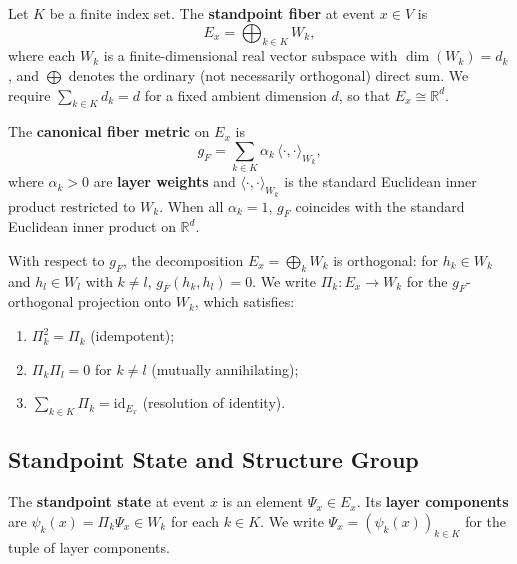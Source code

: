 \begin{definition}
\label{def:fiber}
Let $K$ be a finite index set. The \textbf{standpoint fiber} at event $x \in V$ is
\[
    E_x = \bigoplus_{k \in K} W_k,
\]
where each $W_k$ is a finite-dimensional real vector subspace with $\dim(W_k) = d_k$,
and $\bigoplus$ denotes the ordinary (not necessarily orthogonal) direct sum. We require
$\sum_{k \in K} d_k = d$ for a fixed ambient dimension $d$, so that $E_x \cong
\mathbb{R}^d$.
\end{definition}

\begin{definition}
\label{def:fiber-metric}
The \textbf{canonical fiber metric} on $E_x$ is
\[
    g_F = \sum_{k \in K} \alpha_k\, \langle \cdot, \cdot \rangle_{W_k},
\]
where $\alpha_k > 0$ are \textbf{layer weights} and $\langle \cdot, \cdot \rangle_{W_k}$
is the standard Euclidean inner product restricted to $W_k$. When all $\alpha_k = 1$,
$g_F$ coincides with the standard Euclidean inner product on $\mathbb{R}^d$.

With respect to $g_F$, the decomposition $E_x = \bigoplus_k W_k$ is orthogonal: for
$h_k \in W_k$ and $h_l \in W_l$ with $k \neq l$, $g_F(h_k, h_l) = 0$. We write
$\Pi_k : E_x \to W_k$ for the $g_F$-orthogonal projection onto $W_k$, which satisfies:
\begin{enumerate}
    \item $\Pi_k^2 = \Pi_k$ (idempotent);
    \item $\Pi_k \Pi_l = 0$ for $k \neq l$ (mutually annihilating);
    \item $\sum_{k \in K} \Pi_k = \mathrm{id}_{E_x}$ (resolution of identity).
\end{enumerate}
\end{definition}

\subsection{Standpoint State and Structure Group}
\label{sec:state-group}

\begin{definition}
\label{def:standpoint-state}
The \textbf{standpoint state} at event $x$ is an element $\Psi_x \in E_x$. Its
\textbf{layer components} are $\psi_k(x) = \Pi_k \Psi_x \in W_k$ for each $k \in K$.
We write $\Psi_x = (\psi_k(x))_{k \in K}$ for the tuple of layer components.
\end{definition}

